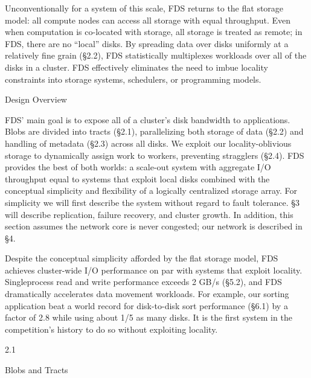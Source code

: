 Unconventionally for a system of this scale, FDS returns to the flat storage model: all compute nodes can access all storage with equal throughput. Even when computation is co-located with storage, all storage is treated
as remote; in FDS, there are no “local” disks. By spreading data over disks uniformly at a relatively fine grain
(§2.2), FDS statistically multiplexes workloads over all
of the disks in a cluster. FDS effectively eliminates the
need to imbue locality constraints into storage systems,
schedulers, or programming models.

Design Overview

FDS’ main goal is to expose all of a cluster’s disk
bandwidth to applications. Blobs are divided into tracts
(§2.1), parallelizing both storage of data (§2.2) and handling of metadata (§2.3) across all disks. We exploit our
locality-oblivious storage to dynamically assign work to
workers, preventing stragglers (§2.4). FDS provides the
best of both worlds: a scale-out system with aggregate
I/O throughput equal to systems that exploit local disks
combined with the conceptual simplicity and flexibility
of a logically centralized storage array.
For simplicity we will first describe the system without regard to fault tolerance. §3 will describe replication,
failure recovery, and cluster growth. In addition, this section assumes the network core is never congested; our
network is described in §4.

Despite the conceptual simplicity afforded by the flat
storage model, FDS achieves cluster-wide I/O performance on par with systems that exploit locality. Singleprocess read and write performance exceeds 2 GB/s
(§5.2), and FDS dramatically accelerates data movement
workloads. For example, our sorting application beat a
world record for disk-to-disk sort performance (§6.1) by
a factor of 2.8 while using about 1/5 as many disks. It
is the first system in the competition’s history to do so
without exploiting locality.

2.1

Blobs and Tracts

